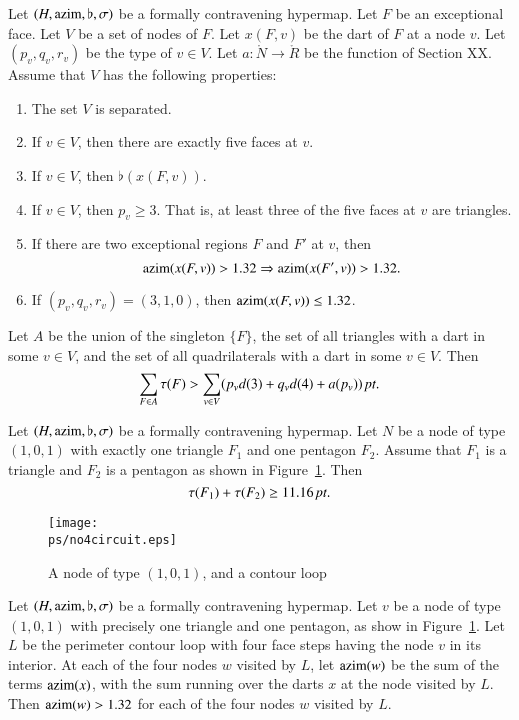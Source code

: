 \begin{lemma} \label{lemma:excess-1:bis}
Let $(H,{\operatorname{azim}},\flat,\sigma)$ be a formally contravening hypermap.
Let $F$ be an exceptional face.  Let $V$ be a set of nodes of $F$.
Let $x(F,v)$ be the dart of $F$ at a node $v$.  Let $(p_v,q_v,r_v)$
be the type of $v\in V$.   Let $a:\ring{N}\to\ring{R}$ be the
function of Section XX. Assume that $V$ has the following
properties:
    \begin{enumerate}
        \item The set $V$ is separated.
        \item If $v\in V$, then there are exactly five faces at
        $v$.
        \item If $v\in V$, then $\flat(x(F,v))$.
        \item If $v\in V$, then $p_v\ge 3$.  That is, at least
        three of the five faces at $v$ are triangles.
        \item If there are two exceptional regions $F$ and $F'$ at
        $v$, then
            $${\operatorname{azim}}(x(F,v)) > 1.32 \Rightarrow {\operatorname{azim}}(x(F',v)) > 1.32.$$
        \item If $(p_v,q_v,r_v)=(3,1,0)$, then ${\operatorname{azim}}(x(F,v))\le 1.32$.
    \end{enumerate}
Let $A$ be the union of the singleton $\{F\}$, the set of all
triangles with a dart in some $v\in V$, and the set of all
quadrilaterals with a dart in some $v\in V$. Then
    $$\sum_{F\in A}\tau(F) > \sum_{v\in V} (p_v d(3) + q_v d(4) + a
    (p_v))\,\hbox{\it pt}.$$
\end{lemma}

\begin{lemma}\label{lemma:11.16:bis}
Let $(H,{\operatorname{azim}},\flat,\sigma)$ be a formally contravening hypermap.
Let $N$ be a node of type $(1,0,1)$ with exactly one triangle $F_1$
and one pentagon $F_2$. Assume that $F_1$ is a triangle and $F_2$ is
a pentagon as shown in Figure~\ref{fig:no4circuit:bis}. Then
    $$\tau(F_1) + \tau(F_2) \ge 11.16\,\hbox{\it pt}.$$
\end{lemma}

\begin{figure}[htb]
  \centering
  \texttt{[image: \\ps/no4circuit.eps]}
  \caption{A node of type $(1,0,1)$, and a contour loop}
  \label{fig:no4circuit:bis}
\end{figure}

\begin{lemma}\label{lemma:nobad4}
Let $(H,{\operatorname{azim}},\flat,\sigma)$ be a formally contravening hypermap.
Let $v$ be a node of type $(1,0,1)$ with precisely one triangle and
one pentagon, as show in Figure~\ref{fig:no4circuit:bis}. Let $L$ be
the perimeter contour loop with four face steps having the node $v$
in its interior.  At each of the four nodes $w$ visited by $L$, let
${\operatorname{azim}}(w)$ be the sum of the terms ${\operatorname{azim}}(x)$, with the sum running
over the darts $x$ at the node visited by $L$.  Then
    ${\operatorname{azim}}(w) > 1.32$
for each of the four nodes $w$ visited by $L$.
\end{lemma}

